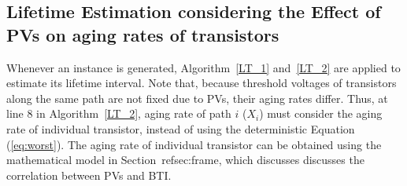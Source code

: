 \subsection{Lifetime Estimation considering the Effect of PVs on aging rates of transistors}
\label{sec:ins:lt}
Whenever an instance is generated, Algorithm~\ref{LT_1} and~\ref{LT_2} are applied to estimate its lifetime interval. Note that, because threshold voltages of transistors along the same path are not fixed due to PVs, their aging rates differ. Thus, at line 8 in Algorithm~\ref{LT_2}, aging rate of path $i$ ($X_{i}$) must consider the aging rate of individual transistor, instead of using the deterministic Equation (\ref{eq:worst}). The aging rate of individual transistor can be obtained using the mathematical model in Section~ref{sec:frame}, which discusses discusses the correlation between PVs and BTI.%


